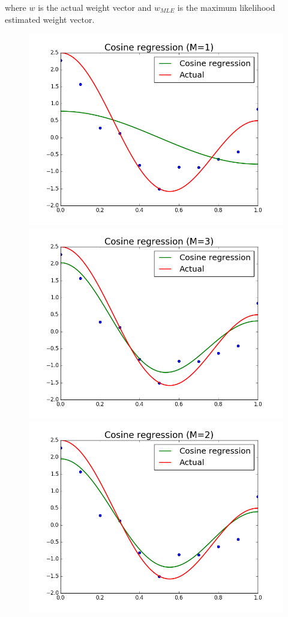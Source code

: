 \documentclass{article}
\begin{document}
where $w$ is the actual weight vector and $w_{MLE}$ is the maximum likelihood estimated weight vector.
\begin{figure}[width=\linewidth]
\centering
\begin{multicols}{2}
  \includegraphics[width=1.2\linewidth]{code/P2/cosine_regression,1.png}
  \includegraphics[width=1.2\linewidth]{code/P2/cosine_regression,3.png}
  \includegraphics[width=1.2\linewidth]{code/P2/cosine_regression,2.png}

\end{multicols}
\end{figure}
\end{document}
